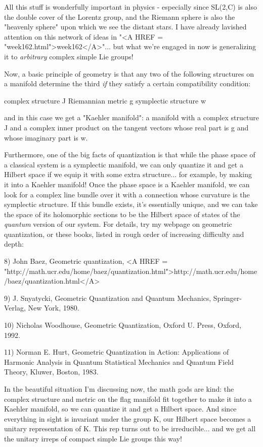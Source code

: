 All this stuff is wonderfully important in physics - especially since
SL(2,C) is also the double cover of the Lorentz group, and the Riemann
sphere is also the "heavenly sphere" upon which we see the distant
stars.  I have already lavished attention on this network of ideas 
in "<A HREF = "week162.html">week162</A>"... but what we're engaged in now is generalizing it to
\emph{arbitrary} complex simple Lie groups! 

Now, a basic principle of geometry is that any two of the following
structures on a manifold determine the third \emph{if} they satisfy a
certain compatibility condition:

complex structure J
Riemannian metric g                  
symplectic structure w

and in this case we get a "Kaehler manifold": a manifold with a complex
structure J and a complex inner product on the tangent vectors whose
real part is g and whose imaginary part is w. 

Furthermore, one of the big facts of quantization is that while the
phase space of a classical system is a symplectic manifold, we can only
quantize it and get a Hilbert space if we equip it with some extra
structure... for example, by making it into a Kaehler manifold!  Once
the phase space is a Kaehler manifold, we can look for a complex line
bundle over it with a connection whose curvature is the symplectic
structure.  If this bundle exists, it's essentially unique, and we can
take the space of its holomorphic sections to be the Hilbert space of
states of the \emph{quantum} version of our system.   For details, try my
webpage on geometric quantization, or these books, listed in rough order
of increasing difficulty and depth:

8) John Baez, Geometric quantization, 
<A HREF = "http://math.ucr.edu/home/baez/quantization.html">http://math.ucr.edu/home/baez/quantization.html</A>

9) J. Snyatycki, Geometric Quantization and Quantum Mechanics,
Springer-Verlag, New York, 1980. 

10) Nicholas Woodhouse, Geometric Quantization, Oxford U. Press, Oxford,
1992.

11) Norman E. Hurt, Geometric Quantization in Action: Applications of
Harmonic Analysis in Quantum Statistical Mechanics and Quantum Field
Theory, Kluwer, Boston, 1983.

In the beautiful situation I'm discussing now, the math gods are kind:
the complex structure and metric on the flag manifold fit together to
make it into a Kaehler manifold, so we can quantize it and get a Hilbert
space.  And since everything in sight is invariant under the group K,
our Hilbert space becomes a unitary representation of K.  This rep turns
out to be irreducible... and we get all the unitary irreps of compact
simple Lie groups this way!

